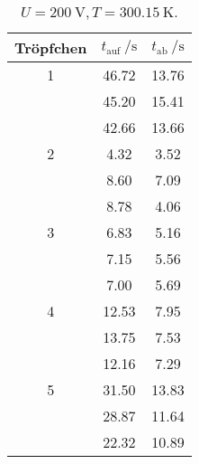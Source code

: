 \begin{table}
	\centering
	\begin{tabular}{S[table-format=1.0] S S}
		\toprule
		{Tröpfchen} & {$t_\mathup{auf}\:/\si\second$} &{$t_\mathup{ab}\:/\si\second$} \\
		 & 46.72 & 13.76\\
  & 45.20 & 15.41\\
  & 42.66 & 13.66\\
2 &  4.32 &  3.52\\
  &  8.60 &  7.09\\
  &  8.78 &  4.06\\
3 &  6.83 &  5.16\\
  &  7.15 &  5.56\\
  &  7.00 &  5.69\\
4 & 12.53 &  7.95\\
  & 13.75 &  7.53\\
  & 12.16 &  7.29\\
5 & 31.50 & 13.83\\
  & 28.87 & 11.64\\
  & 22.32 & 10.89\\
		\bottomrule
	\end{tabular}
	\caption{$U=\SI{200}{\volt}$,\,$T=\SI{300.15}{\kelvin}$.} 
	\label{tab:T1}
\end{table}
